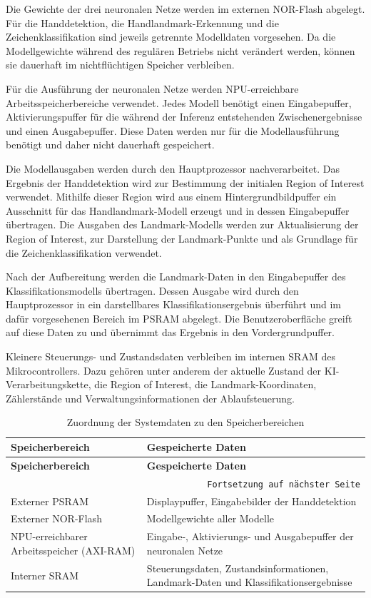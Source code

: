 Die Gewichte der drei neuronalen Netze werden im externen NOR-Flash abgelegt. Für die Handdetektion, die Handlandmark-Erkennung und die Zeichenklassifikation sind jeweils getrennte Modelldaten vorgesehen. Da die Modellgewichte während des regulären Betriebs nicht verändert werden, können sie dauerhaft im nichtflüchtigen Speicher verbleiben.

Für die Ausführung der neuronalen Netze werden NPU-erreichbare Arbeitsspeicherbereiche verwendet. Jedes Modell benötigt einen Eingabepuffer, Aktivierungspuffer für die während der Inferenz entstehenden Zwischenergebnisse und einen Ausgabepuffer. Diese Daten werden nur für die Modellausführung benötigt und daher nicht dauerhaft gespeichert.

Die Modellausgaben werden durch den Hauptprozessor nachverarbeitet. Das Ergebnis der Handdetektion wird zur Bestimmung der initialen Region of Interest verwendet. Mithilfe dieser Region wird aus einem Hintergrundbildpuffer ein Ausschnitt für das Handlandmark-Modell erzeugt und in dessen Eingabepuffer übertragen. Die Ausgaben des Landmark-Modells werden zur Aktualisierung der Region of Interest, zur Darstellung der Landmark-Punkte und als Grundlage für die Zeichenklassifikation verwendet.

Nach der Aufbereitung werden die Landmark-Daten in den Eingabepuffer des Klassifikationsmodells übertragen. Dessen Ausgabe wird durch den Hauptprozessor in ein darstellbares Klassifikationsergebnis überführt und im dafür vorgesehenen Bereich im PSRAM abgelegt. Die Benutzeroberfläche greift auf diese Daten zu und übernimmt das Ergebnis in den Vordergrundpuffer.

Kleinere Steuerungs- und Zustandsdaten verbleiben im internen SRAM des Mikrocontrollers. Dazu gehören unter anderem der aktuelle Zustand der KI-Verarbeitungskette, die Region of Interest, die Landmark-Koordinaten, Zählerstände und Verwaltungsinformationen der Ablaufsteuerung.

\begin{longtable}[H]{|p{}|p{}|}
    \caption{Zuordnung der Systemdaten zu den Speicherbereichen}
    \label{tab:speicherzuordnung} \\
    \hline
    \textbf{Speicherbereich} & \textbf{Gespeicherte Daten} \\
    \hline
    \endfirsthead
    \hline
    \textbf{Speicherbereich} & \textbf{Gespeicherte Daten} \\
    \hline
    \endhead
    \hline
    \multicolumn{2}{r}{\texttt{Fortsetzung auf nächster Seite}} \\
    \endfoot
    \hline
    \endlastfoot
    Externer PSRAM & Displaypuffer, Eingabebilder der Handdetektion \\
    \hline
    Externer NOR-Flash & Modellgewichte aller Modelle \\
    \hline
    NPU-erreichbarer Arbeitsspeicher (AXI-RAM) & Eingabe-, Aktivierungs- und Ausgabepuffer der neuronalen Netze \\
    \hline
    Interner SRAM & Steuerungsdaten, Zustandsinformationen, Landmark-Daten und Klassifikationsergebnisse \\
    \hline
\end{longtable}

